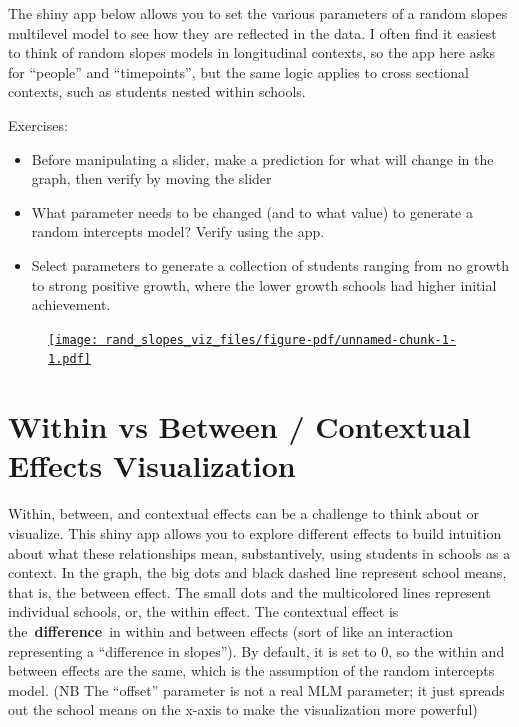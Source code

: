 \documentclass[
  letterpaper,
  DIV=11,
  numbers=noendperiod]{scrreprt}
\begin{document}
The shiny app below allows you to set the various parameters of a random
slopes multilevel model to see how they are reflected in the data. I
often find it easiest to think of random slopes models in longitudinal
contexts, so the app here asks for ``people'' and ``timepoints'', but
the same logic applies to cross sectional contexts, such as students
nested within schools.

Exercises:

\begin{itemize}
\item
  Before manipulating a slider, make a prediction for what will change
  in the graph, then verify by moving the slider
\item
  What parameter needs to be changed (and to what value) to generate a
  random intercepts model? Verify using the app.
\item
  Select parameters to generate a collection of students ranging from no
  growth to strong positive growth, where the lower growth schools had
  higher initial achievement.
\end{itemize}

\begin{figure}

{\centering 

\href{https://s43dnt-josh-gilbert.shinyapps.io/s43_rand_slopes_viz/}{\texttt{[image: rand\_slopes\_viz\_files/figure-pdf/unnamed-chunk-1-1.pdf]}}

}

\end{figure}

\hypertarget{within-vs-between-contextual-effects-visualization}{%
\chapter{Within vs Between / Contextual Effects
Visualization}\label{within-vs-between-contextual-effects-visualization}}

Within, between, and contextual effects can be a challenge to think
about or visualize. This shiny app allows you to explore different
effects to build intuition about what these relationships mean,
substantively, using students in schools as a context. In the graph, the
big dots and black dashed line represent school means, that is, the
between effect. The small dots and the multicolored lines represent
individual schools, or, the within effect. The contextual effect is
the~\textbf{difference}~in within and between effects (sort of like an
interaction representing a ``difference in slopes''). By default, it is
set to 0, so the within and between effects are the same, which is the
assumption of the random intercepts model. (NB The ``offset'' parameter
is not a real MLM parameter; it just spreads out the school means on the
x-axis to make the visualization more powerful)
\end{document}
